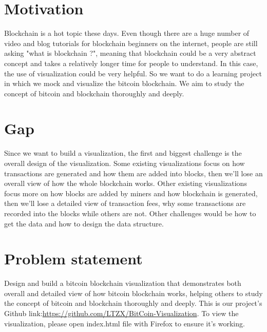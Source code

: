 \documentclass[journal, a4paper]{IEEEtran}
\begin{document}
\section{Motivation}
Blockchain is a hot topic these days. Even though there are a huge number of video and blog tutorials for blockchain beginners on the internet, people are still asking "what is blockchain ?", meaning that blockchain could be a very abstract concept and takes a relatively longer time for people to understand. In this case, the use of visualization could be very helpful. So we want to do a learning project in which we mock and visualize the bitcoin blockchain. We aim to study the concept of bitcoin and blockchain thoroughly and deeply.

\section{Gap}
Since we want to build a visualization, the first and biggest challenge is the overall design of the visualization. Some existing visualizations focus on how transactions are generated and how them are added into blocks, then we'll lose an overall view of how the whole blockchain works. Other existing visualizations focus more on how blocks are added by miners and how blockchain is generated, then we'll lose a detailed view of transaction fees, why some transactions are recorded into the blocks while others are not. Other challenges would be how to get the data and how to design the data structure.

\section{Problem statement}
Design and build a bitcoin blockchain visualization that demonstrates both overall and detailed view of how bitcoin blockchain works, helping others to study the concept of bitcoin and blockchain thoroughly and deeply. This is our project's Github link:\href{https://github.com/LTZX/BitCoin-Visualization}{https://github.com/LTZX/BitCoin-Visualization}. To view the visualization, please open index.html file with Firefox to ensure it's working.
\end{document}
